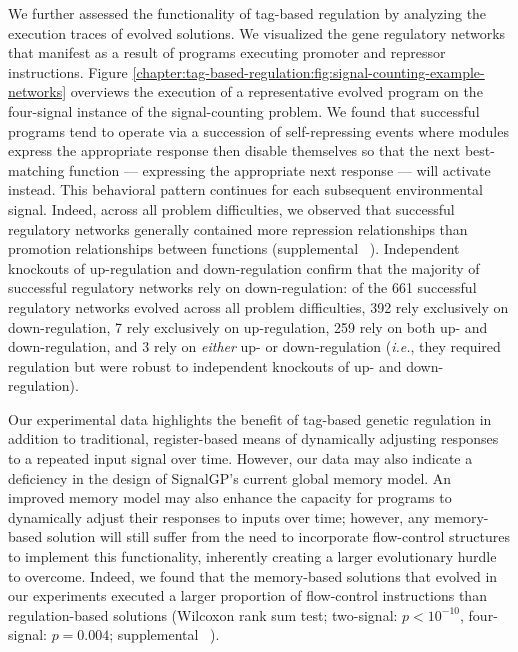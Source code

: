 

We further assessed the functionality of tag-based regulation by analyzing the execution traces of evolved solutions.
We visualized the gene regulatory networks that manifest as a result of programs executing promoter and repressor instructions. 
Figure \ref{chapter:tag-based-regulation:fig:signal-counting-example-networks} overviews the execution of a representative evolved program on the four-signal instance of the signal-counting problem.
We found that successful programs tend to operate via a succession of self-repressing events where modules express the appropriate response then disable themselves so that the next best-matching function --- expressing the appropriate next response --- will activate instead.
This behavioral pattern continues for each subsequent environmental signal.
Indeed, across all problem difficulties, we observed that successful regulatory networks generally contained more repression relationships than promotion relationships between functions (supplemental \supSecRepeatedSigAnalysis\  \citep{tag_regulation_supplement_2021}).
Independent knockouts of up-regulation and down-regulation confirm that the majority of successful regulatory networks rely on down-regulation: 
of the 661 successful regulatory networks evolved across all problem difficulties, 392 rely exclusively on down-regulation, 7 rely exclusively on up-regulation, 259 rely on both up- and down-regulation, and 3 rely on \textit{either} up- or down-regulation (\textit{i.e.}, they required regulation but were robust to independent knockouts of up- and down-regulation). 

Our experimental data highlights the benefit of tag-based genetic regulation in addition to traditional, register-based means of dynamically adjusting responses to a repeated input signal over time. 
However, our data may also indicate a deficiency in the design of SignalGP's current global memory model.
An improved memory model may also enhance the capacity for programs to dynamically adjust their responses to inputs over time; however, any memory-based solution will still suffer from the need to incorporate flow-control structures to implement this functionality, inherently creating a larger evolutionary hurdle to overcome.
Indeed, we found that the memory-based solutions that evolved in our experiments executed a larger proportion of flow-control instructions than regulation-based solutions
(Wilcoxon rank sum test; two-signal: $p < 10^{-10}$, four-signal: $p = 0.004$; supplemental \supSecRepeatedSigAnalysis\ \citep{tag_regulation_supplement_2021}).

